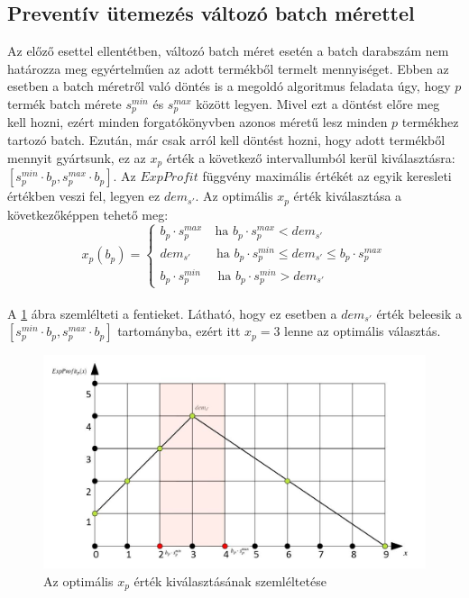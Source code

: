\documentclass [12pt]{report}
\begin{document}
\subsection{Preventív ütemezés változó batch mérettel}
Az előző esettel ellentétben, változó batch méret esetén a batch darabszám nem határozza meg egyértelműen az adott termékből termelt mennyiséget. Ebben az esetben a batch méretről való döntés is a megoldó algoritmus feladata úgy, hogy $p$ termék batch mérete $s_p^{min}$ és $s_p^{max}$ között legyen. Mivel ezt a döntést előre meg kell hozni, ezért minden forgatókönyvben azonos méretű lesz minden $p$ termékhez tartozó batch. Ezután, már csak arról kell döntést hozni, hogy adott termékből mennyit gyártsunk, ez az $x_p$ érték a következő intervallumból kerül kiválasztásra: $[s_p^{min} \cdot b_p , s_p^{max} \cdot b_p]$. Az $ExpProfit$ függvény maximális értékét az egyik keresleti értékben veszi fel, legyen ez $dem_{s'}$. Az optimális $x_p$ érték kiválasztása a következőképpen tehető meg:
\begin{equation*}
x_{p}(b_p)= \begin{cases}
            b_p \cdot s_p^{max} \quad \text{ha } b_p \cdot s_p^{max}<dem_{s'}\\
            dem_{s'} \qquad \text{ha } b_p \cdot s_p^{min} \leq dem_{s'} \leq b_p \cdot s_p^{max}\\
            b_p \cdot s_p^{min} \quad \text{ ha } b_p \cdot s_p^{min}>dem_{s'}
       \end{cases}       
\end{equation*}\\
A \ref{expProfit_func_var} ábra szemlélteti a fentieket. Látható, hogy ez esetben a $dem_{s'}$ érték beleesik a \\$[s_p^{min} \cdot b_p , s_p^{max} \cdot b_p]$ tartományba, ezért itt $x_p=3$ lenne az optimális választás.
\begin{figure}
\begin{center}
\includegraphics[scale=0.5]{expProfit_func_var}
\caption{Az optimális $x_p$ érték kiválasztásának szemléltetése}
\label{expProfit_func_var}
\end{center}
\end{figure}
\end{document}

